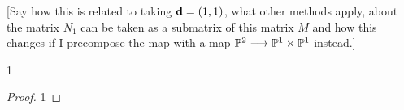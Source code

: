\documentclass[fleqn,reqno]{amsart}
\numberwithin{first}{chapter}
\begin{document}
[Say how this is related to taking $\mathbf d=(1,1)$, what other methods apply, about the matrix $N_1$
can be taken as a submatrix of this matrix $M$ and how this changes if I precompose the map with
a map $\mathbb{P}^2\longrightarrow\mathbb{P}^1\times\mathbb{P}^1$ instead.]



\begin{lemma}
\label{lemma:push-gens}
1
\end{lemma}

\begin{proof}1
\end{proof}





\end{document}
